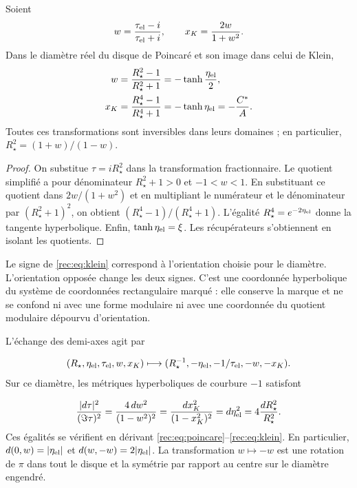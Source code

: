 \begin{theorem}
\label{rec:thm:klein}
Soient
\[
 w=\frac{\tau_{\rm el}-i}{\tau_{\rm el}+i},\qquad
 x_K=\frac{2w}{1+w^2}.
\]
Dans le diamètre réel du disque de Poincaré et son image dans celui de Klein,
\begin{align}
 w&=\frac{R_\star^2-1}{R_\star^2+1}
      =-\tanh\frac{\eta_{\rm el}}2,\label{rec:eq:poincare}\\
 x_K&=\frac{R_\star^4-1}{R_\star^4+1}
      =-\tanh\eta_{\rm el}=-\frac{C^*}{A}.\label{rec:eq:klein}
\end{align}
Toutes ces transformations sont inversibles dans leurs domaines ; en particulier,
\(R_\star^2=(1+w)/(1-w)\).

\end{theorem}
\begin{proof}
On substitue \(\tau=iR_\star^2\) dans la transformation fractionnaire. Le quotient simplifié a pour dénominateur \(R_\star^2+1>0\) et \(-1<w<1\). En substituant ce quotient dans \(2w/(1+w^2)\) et en multipliant le numérateur et le dénominateur par \((R_\star^2+1)^2\), on obtient \((R_\star^4-1)/(R_\star^4+1)\). L’égalité \(R_\star^4=e^{-2\eta_{\rm el}}\) donne la tangente hyperbolique. Enfin, \(\tanh\eta_{\rm el}=\xi\). Les récupérateurs s’obtiennent en isolant les quotients.
\end{proof}

Le signe de \eqref{rec:eq:klein} correspond à l’orientation choisie pour le diamètre. L’orientation opposée change les deux signes. C’est une coordonnée hyperbolique du système de coordonnées rectangulaire marqué : elle conserve la marque et ne se confond ni avec une forme modulaire ni avec une coordonnée du quotient modulaire dépourvu d’orientation.

L’échange des demi-axes agit par

\begin{equation}
 (R_\star,\eta_{\rm el},\tau_{\rm el},w,x_K)
 \longmapsto(R_\star^{-1},-\eta_{\rm el},-1/\tau_{\rm el},-w,-x_K).
 \label{rec:eq:reciproco-radial}
\end{equation}
Sur ce diamètre, les métriques hyperboliques de courbure \(-1\) satisfont

\begin{equation}
 \frac{|d\tau|^2}{(\Im\tau)^2}
 =\frac{4\,dw^2}{(1-w^2)^2}
 =\frac{dx_K^2}{(1-x_K^2)^2}
 =d\eta_{\rm el}^2=4\frac{dR_\star^2}{R_\star^2}.
 \label{rec:eq:metricas}
\end{equation}
Ces égalités se vérifient en dérivant \eqref{rec:eq:poincare}--\eqref{rec:eq:klein}. En particulier, \(d(0,w)=|\eta_{\rm el}|\) et \(d(w,-w)=2|\eta_{\rm el}|\). La transformation \(w\mapsto-w\) est une rotation de \(\pi\) dans tout le disque et la symétrie par rapport au centre sur le diamètre engendré.


